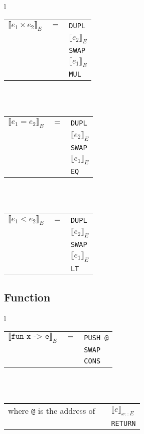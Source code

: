 \documentclass[12pt]{article}
\begin{document}
\begin{tabular}{l}
\begin{tabular}{ccl}
    $\llbracket e_1 \times e_2 \rrbracket_{E}$ & $=$ & \texttt{DUPL}\\
    & & $\llbracket e_2 \rrbracket_{E}$\\
    & & \texttt{SWAP}\\
    & & $\llbracket e_1 \rrbracket_{E}$\\
    & & \texttt{MUL}\\
\end{tabular}\\
\\
\begin{tabular}{ccl}
    $\llbracket e_1 = e_2 \rrbracket_{E}$ & $=$ & \texttt{DUPL}\\
    & & $\llbracket e_2 \rrbracket_{E}$\\
    & & \texttt{SWAP}\\
    & & $\llbracket e_1 \rrbracket_{E}$\\
    & & \texttt{EQ}\\
\end{tabular}\\
\\            
\begin{tabular}{ccl}
    $\llbracket e_1 < e_2 \rrbracket_{E}$ & $=$ & \texttt{DUPL}\\
    & & $\llbracket e_2 \rrbracket_{E}$\\
    & & \texttt{SWAP}\\
    & & $\llbracket e_1 \rrbracket_{E}$\\
    & & \texttt{LT}\\
\end{tabular}
\end{tabular}
    
\subsection*{Function}

\begin{tabular}{l}

\begin{tabular}{ccl}
    $\llbracket \texttt{fun x -> e} \rrbracket_{E}$ & $=$ & \texttt{PUSH @}\\
    & & \texttt{SWAP}\\
    & & \texttt{CONS}\\
\end{tabular}\\
\\

\begin{tabular}{ccl}
where \texttt{@} is the address of & & $\llbracket e \rrbracket_{x::E}$\\
    & & \texttt{RETURN}\\
\end{tabular}
        
\end{tabular}
    
\end{document}
